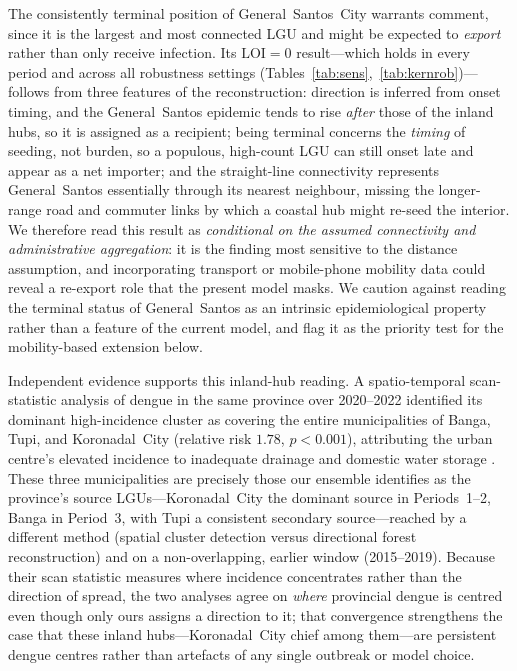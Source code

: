 \documentclass[a4paper,11pt]{article}
\begin{document}
The consistently terminal position of General~Santos~City warrants comment, since it
is the largest and most connected LGU and might be expected to \emph{export} rather
than only receive infection. Its $\mathrm{LOI}=0$ result---which holds in every period and
across all robustness settings (Tables~\ref{tab:sens},~\ref{tab:kernrob})---follows
from three features of the reconstruction: direction is inferred from onset timing,
and the General~Santos epidemic tends to rise \emph{after} those of the inland hubs,
so it is assigned as a recipient; being terminal concerns the \emph{timing} of
seeding, not burden, so a populous, high-count LGU can still onset late and appear as
a net importer; and the straight-line connectivity represents General~Santos
essentially through its nearest neighbour, missing the longer-range road and commuter
links by which a coastal hub might re-seed the interior. We therefore read this result
as \emph{conditional on the assumed connectivity and administrative aggregation}: it
is the finding most sensitive to the distance assumption, and incorporating transport
or mobile-phone mobility data could reveal a re-export role that the present model
masks. We caution against reading the terminal status of General~Santos as an
intrinsic epidemiological property rather than a feature of the current model, and
flag it as the priority test for the mobility-based extension below.

Independent evidence supports this inland-hub reading. A spatio-temporal
scan-statistic analysis of dengue in the same province over 2020--2022 identified its
dominant high-incidence cluster as covering the entire municipalities of Banga, Tupi,
and Koronadal~City (relative risk $1.78$, $p<0.001$), attributing the urban centre's
elevated incidence to inadequate drainage and domestic water storage \cite{Ygona2025}.
These three municipalities are precisely those our ensemble identifies as the
province's source LGUs---Koronadal~City the dominant source in Periods~1--2, Banga in
Period~3, with Tupi a consistent secondary source---reached by a different method
(spatial cluster detection versus directional forest reconstruction) and on a
non-overlapping, earlier window (2015--2019). Because their scan statistic measures
where incidence concentrates rather than the direction of spread, the two analyses
agree on \emph{where} provincial dengue is centred even though only ours assigns a
direction to it; that convergence strengthens the case that these inland hubs---Koronadal~City
chief among them---are persistent dengue centres rather than artefacts of any single
outbreak or model choice.
\end{document}
